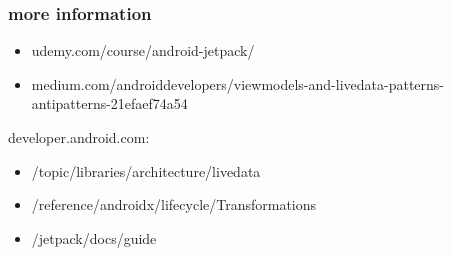 \documentclass{beamer}
\begin{document}
	\begin{frame}
		\frametitle{more information}
		\begin{itemize}
			\item udemy.com/course/android-jetpack/
			\item medium.com/androiddevelopers/viewmodels-and-livedata-patterns-antipatterns-21efaef74a54
		\end{itemize}
		developer.android.com:
		\begin{itemize}
			\item /topic/libraries/architecture/livedata
			\item /reference/androidx/lifecycle/Transformations
			\item /jetpack/docs/guide
		\end{itemize}
	\end{frame}
	
\end{document}
